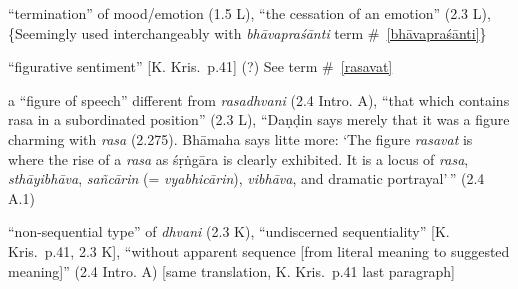 \documentclass[10pt]{article}
\begin{document}
\begin{multicols}{2}
\begin{enumerate}[
			leftmargin=0em,
			rightmargin=0em,
		]

		 ``termination'' of mood/emotion (1.5 L),
		``the cessation of an emotion'' (2.3 L),
		\{Seemingly used interchangeably with \textit{bhāvapraśānti} term \#~\ref{bhāvapraśānti}\}



		 ``figurative sentiment'' [K. Kris.\ p.41] (?)
		See term \#~\ref{rasavat}

		 a ``figure of speech'' different from \textit{rasadhvani} (2.4 Intro. A),
		``that which contains rasa in a subordinated position'' (2.3 L),
		``Daṇḍin says merely that it was a figure charming with \textit{rasa} (2.275).
		Bhāmaha says litte more: `The figure \textit{rasavat} is where the rise of a \textit{rasa} as śṛṅgāra is clearly exhibited. It is a locus of \textit{rasa}, \textit{sthāyibhāva}, \textit{sañcārin} (= \textit{vyabhicārin}), \textit{vibhāva}, and dramatic portrayal'\,'' (2.4 A.1)%

		\litem{---------} ``non-sequential type'' of \textit{dhvani} (2.3 K),
		``undiscerned sequentiality'' [K. Kris.\ p.41, 2.3 K],
		``without apparent sequence [from literal meaning to suggested meaning]'' (2.4 Intro. A)
		[same translation, K. Kris.\ p.41 last paragraph]%




\end{enumerate}
\end{multicols}
\end{document}
